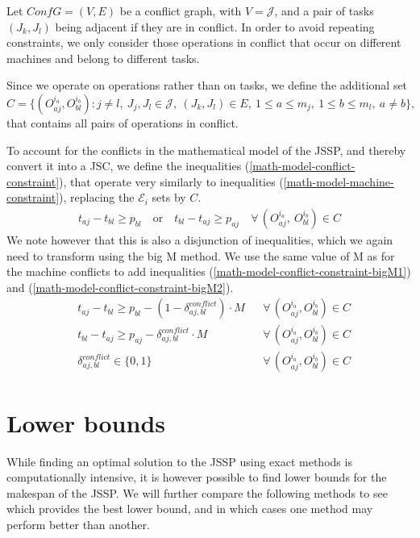 \documentclass{mimosis}
\begin{document}
Let \(ConfG = (V, E)\) be a conflict graph, with \(V = \mathcal{J}\), and a pair of tasks \((J_k, J_l)\) being adjacent if they are in conflict. In order to avoid repeating constraints, we only consider those operations in conflict that occur on different machines and belong to different tasks. 

Since we operate on operations rather than on tasks, we define the additional set  
\[ 
C = \{(O_{aj}^{i_a}, O_{bl}^{i_b}) : j \ne l,\ J_j, J_l \in \mathcal{J},\ (J_k, J_l) \in E,\ 1 \leq a \leq m_j,\ 1 \leq b \leq m_l,\ a \neq b\}, 
\]
that contains all pairs of operations in conflict. 

To account for the conflicts in the mathematical model of the JSSP, and thereby convert it into a JSC, we define the inequalities (\ref{math-model-conflict-constraint}), that operate very similarly to inequalities (\ref{math-model-machine-constraint}), replacing the \(\mathcal{E}_i\) sets by \(C\).
\begin{align} 
\label{math-model-conflict-constraint}
t_{aj} - t_{bl} \geq p_{bl} \quad \text{or} \quad t_{bl} - t_{aj} \geq p_{aj} \quad \forall\, (O_{aj}^{i_a},\ O_{bl}^{i_b}) \in C
\end{align} 
We note however that this is also a disjunction of inequalities, which we again need to transform using the big M method. We use the same value of M as for the machine conflicts to add inequalities (\ref{math-model-conflict-constraint-bigM1}) and (\ref{math-model-conflict-constraint-bigM2}).
\begin{align}
&t_{aj} - t_{bl} \ge p_{bl} - (1 - \delta_{aj,bl}^{conflict}) \cdot M
&& \forall\, (O_{aj}^{i_a}, O_{bl}^{i_b}) \in C
\label{math-model-conflict-constraint-bigM1} \\
&t_{bl} - t_{aj} \ge p_{aj} - \delta_{aj,bl}^{conflict} \cdot M
&& \forall\, (O_{aj}^{i_a}, O_{bl}^{i_b}) \in C
\label{math-model-conflict-constraint-bigM2} \\
&\delta_{aj,bl}^{conflict} \in \{0,1\}
&& \forall\, (O_{aj}^{i_a}, O_{bl}^{i_b}) \in C
\label{math-model-delta-conflict-binary}
\end{align}
\section{Lower bounds} \label{Lower bounds}
While finding an optimal solution to the JSSP using exact methods is computationally intensive, it is however possible to find lower bounds for the makespan of the JSSP. We will further compare the following methods to see which provides the best lower bound, and in which cases one method may perform better than another.
\end{document}
